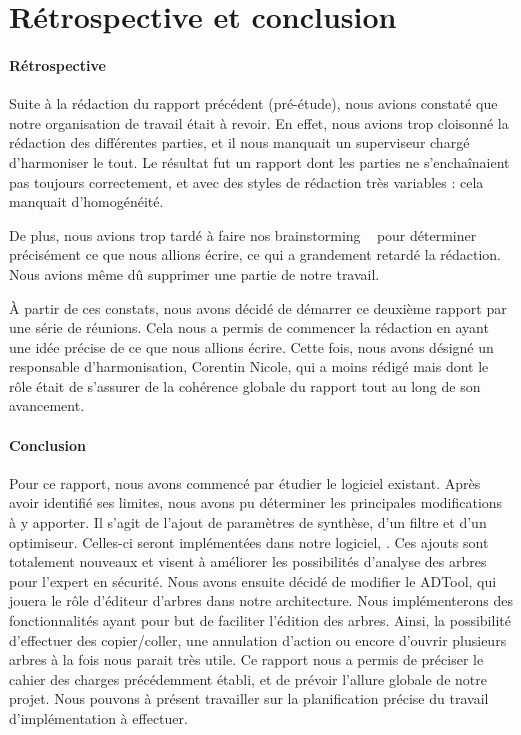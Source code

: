 \section{Rétrospective et conclusion}
	\paragraph{Rétrospective} Suite à la rédaction du rapport précédent (pré-étude), nous avions constaté que notre organisation de travail était à revoir. En effet, nous avions trop cloisonné la rédaction des différentes parties, et il nous manquait un superviseur chargé d'harmoniser le tout. Le résultat fut un rapport dont les parties ne s'enchaînaient pas toujours correctement, et avec des styles de rédaction très variables : cela manquait d'homogénéité.

	De plus, nous avions trop tardé à faire nos \og brainstorming \fg~ pour déterminer précisément ce que nous allions écrire, ce qui a grandement retardé la rédaction. Nous avions même dû supprimer une partie de notre travail.

	À partir de ces constats, nous avons décidé de démarrer ce deuxième rapport par une série de réunions. Cela nous a permis de commencer la rédaction en ayant une idée précise de ce que nous allions écrire. Cette fois, nous avons désigné un responsable d'harmonisation, Corentin {\sc Nicole}, qui a moins rédigé mais dont le rôle était de s'assurer de la cohérence globale du rapport tout au long de son avancement.

	\paragraph{Conclusion} Pour ce rapport, nous avons commencé par étudier le logiciel existant. Après avoir identifié ses limites, nous avons pu déterminer les principales modifications à y apporter. Il s'agit de l'ajout de paramètres de synthèse, d'un filtre et d'un optimiseur. Celles-ci seront implémentées dans notre logiciel, \glasir{}. Ces ajouts sont totalement nouveaux et visent à améliorer les possibilités d'analyse des arbres pour l'expert en sécurité. Nous avons ensuite décidé de modifier le ADTool, qui jouera le rôle d'éditeur d'arbres dans notre architecture. Nous implémenterons des fonctionnalités ayant pour but de faciliter l'édition des arbres. Ainsi, la possibilité d'effectuer des copier/coller, une annulation d'action ou encore d'ouvrir plusieurs arbres à la fois nous parait très utile. Ce rapport nous a permis de préciser le cahier des charges précédemment établi, et de prévoir l'allure globale de notre projet. Nous pouvons à présent travailler sur la planification précise du travail d'implémentation à effectuer.